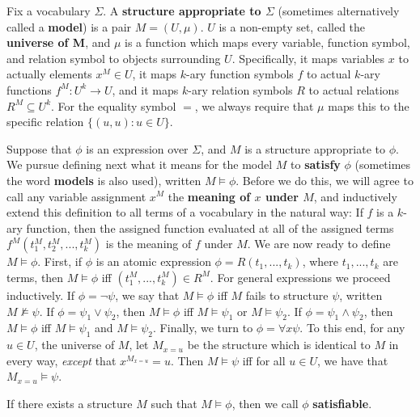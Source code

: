 \begin{definition}
    Fix a vocabulary $\Sigma$. A \textbf{structure appropriate to $\Sigma$} (sometimes alternatively called a \textbf{model}) is a pair $M=(U,\mu)$. $U$ is a non-empty set, called the \textbf{universe of M}, and $\mu$ is a function which maps every variable, function symbol, and relation symbol to objects surrounding $U$. Specifically, it maps variables $x$ to actually elements $x^M \in U$, it maps $k$-ary function symbols $f$ to actual $k$-ary functions $f^M:U^k \to U$, and it maps $k$-ary relation symbols $R$ to actual relations $R^M \subseteq U^k$. For the equality symbol $=$, we always require that $\mu$ maps this to the specific relation $\{(u,u): u \in U\}$. 
    \par Suppose that $\phi$ is an expression over $\Sigma$, and $M$ is a structure appropriate to $\phi$. We pursue defining next what it means for the model $M$ to \textbf{satisfy} $\phi$ (sometimes the word \textbf{models} is also used), written $M \models \phi$. Before we do this, we will agree to call any variable assignment $x^M$ the \textbf{meaning of $x$ under $M$}, and inductively extend this definition to all terms of a vocabulary in the natural way: If $f$ is a $k$-ary function, then the assigned function evaluated at all of the assigned terms $f^M(t_1^M,t_2^M,...,t_k^M)$ is the meaning of $f$ under $M$. We are now ready to define $M \models \phi$. First, if $\phi$ is an atomic expression $\phi = R(t_1,...,t_k)$, where $t_1,...,t_k$ are terms, then $M \models \phi$ iff $(t_1^M,...,t_k^M) \in R^M$. For general expressions we proceed inductively. If $\phi = \neg \psi$, we say that $M \models \phi$ iff $M$ fails to structure $\psi$, written $M \nvDash \psi$. If $\phi = \psi_1 \vee \psi_2$, then $M \models \phi$ iff $M \models \psi_1$ or $M \models \psi_2$. If $\phi = \psi_1 \wedge \psi_2$, then $M \models \phi$ iff $M \models \psi_1$ and $M \models \psi_2$. Finally, we turn to $\phi = \forall x \psi$. To this end, for any $u \in U$, the universe of $M$, let $M_{x=u}$ be the structure which is identical to $M$ in every way, \textit{except} that $x^{M_{x=u}} = u$. Then $M \models \psi$ iff for all $u \in U$, we have that $M_{x=u} \models \psi$. 
    \par If there exists a structure $M$ such that $M \models \phi$, then we call $\phi$ \textbf{satisfiable}.
\end{definition}
